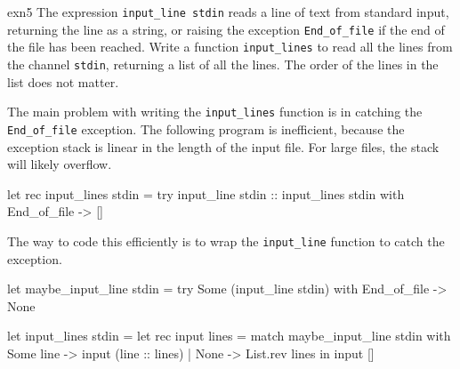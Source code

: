 %
\begin{exercise}{exn5}
The expression \lstinline+input_line stdin+ reads a line of text from standard input, returning the line
as a string, or raising the exception \lstinline+End_of_file+ if the end of the file has been reached.
Write a function \lstinline+input_lines+ to read all the lines from the channel \lstinline+stdin+, returning a
list of all the lines.  The order of the lines in the list does not matter.

\begin{answer}\ifanswers
The main problem with writing the \lstinline+input_lines+ function is in catching the \lstinline+End_of_file+ exception.
The following program is inefficient, because the exception stack is linear in the length of the input file.
For large files, the stack will likely overflow.

\begin{center}
\begin{ocaml}
let rec input_lines stdin =
    try input_line stdin :: input_lines stdin with
       End_of_file ->
          []
\end{ocaml}
\end{center}
%
The way to code this efficiently is to wrap the \lstinline+input_line+ function to catch the exception.

\begin{center}
\begin{ocaml}
let maybe_input_line stdin =
   try Some (input_line stdin) with
      End_of_file ->
         None

let input_lines stdin =
   let rec input lines =
      match maybe_input_line stdin with
         Some line -> input (line :: lines)
       | None -> List.rev lines
   in
      input []
\end{ocaml}
\end{center}
\fi\end{answer}
\end{exercise}


